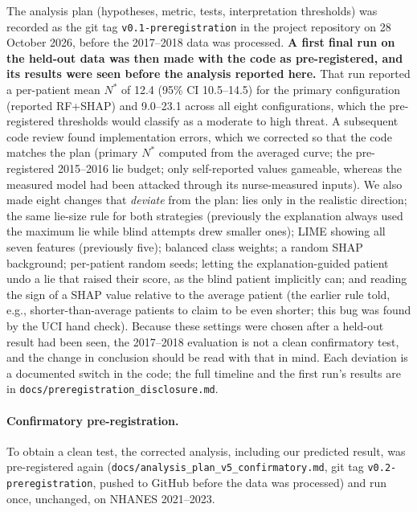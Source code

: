 \documentclass[sigconf,nonacm]{acmart}
\begin{document}
The analysis plan (hypotheses, metric, tests, interpretation
thresholds) was recorded as the git tag \texttt{v0.1-preregistration}
in the project repository on 28 October 2026, before the 2017--2018
data was processed.  \textbf{A first final run on the held-out data was
then made with the code as pre-registered, and its results were seen
before the analysis reported here.}  That run reported a per-patient
mean $N^*$ of 12.4 (95\% CI 10.5--14.5) for the primary configuration
(reported RF+SHAP) and 9.0--23.1 across all eight configurations,
which the pre-registered thresholds would classify as a moderate to
high threat.  A subsequent code review found implementation errors,
which we corrected so that the code matches the plan (primary $N^*$
computed from the averaged curve; the pre-registered 2015--2016 lie
budget; only self-reported values gameable, whereas the measured model
had been attacked through its nurse-measured inputs).  We also made
eight changes that \emph{deviate} from the plan: lies only in the
realistic direction; the same lie-size rule for both strategies
(previously the explanation always used the maximum lie while blind
attempts drew smaller ones); LIME showing all seven features
(previously five); balanced class weights; a random SHAP background;
per-patient random seeds; letting the explanation-guided patient
undo a lie that raised their score, as the blind patient implicitly
can; and reading the sign of a SHAP value relative to the average
patient (the earlier rule told, e.g., shorter-than-average patients to
claim to be even shorter; this bug was found by the UCI hand check).  Because these settings were chosen after a held-out result had
been seen, the 2017--2018 evaluation is not a clean confirmatory test,
and the change in conclusion should be read with that in mind.  Each
deviation is a documented switch in the code; the full timeline and the
first run's results are in \texttt{docs/preregistration\_disclosure.md}.

\paragraph{Confirmatory pre-registration.}\label{sec:confirmatory}
To obtain a clean test, the corrected analysis, including our predicted
result, was pre-registered again (\texttt{docs/analysis\_plan\_v5\_confirmatory.md},
git tag \texttt{v0.2-preregistration}, pushed to GitHub before the data
was processed) and run once, unchanged, on NHANES 2021--2023.

\end{document}
